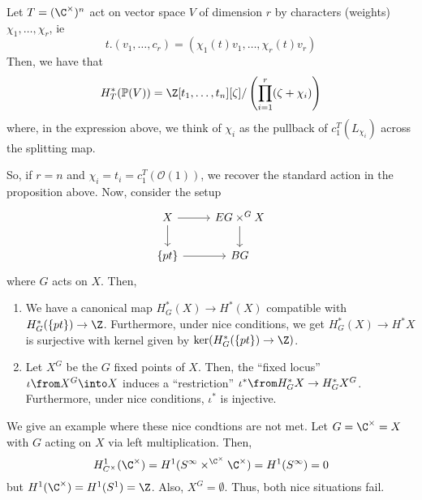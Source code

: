 \documentclass[11pt,leqno,oneside]{amsbook}
\renewcommand{\P}{\mathbb{P}}
\numberwithin{thm}{section}
\renewcommand{\O}{\mathcal{O}}
\begin{document}
\begin{thm}[A Generalization]
  Let \(T = (\C^\times)^n\) act on vector space \(V\) of dimension
  \(r\) by characters (weights) \(\chi_1, \ldots, \chi_r\), ie \[
    t.(v_1, \ldots, c_r) = (\chi_1(t)v_1, \ldots, \chi_r(t)v_r)
  \]
  Then, we have that \[
    H^*_T(\P(V)) = \Z[t_1, \ldots, t_n][\zeta]/\left( \prod_{i=1}^r (\zeta+\chi_i) \right)
  \]
  where, in the expression above, we think of \(\chi_i\) as the
  pullback of \(c_1^T(L_{\chi_i})\) across the splitting map. 
\end{thm}
So, if \(r=n\) and \(\chi_i = t_i = c_1^T(\O(1))\), we recover the
standard action in the proposition above. Now, consider the setup \[
  \begin{tikzcd}
    X \ar[d] \ar[r] & EG \times^G X \ar[d]\\
    \{pt\} \ar[r] & BG
  \end{tikzcd}
\]
where \(G\) acts on \(X\). Then,
\begin{enumerate}
\item We have a canonical map \(H^*_G(X) \to H^*(X)\) compatible with
  \(H^*_G(\{pt\}) \to \Z\). Furthermore, under nice conditions, we get
  \(H^*_G(X) \to H^*X\) is surjective with kernel given by
  \(\ker(H^*_G(\{pt\}) \to \Z)\).
\item Let \(X^G\) be the \(G\) fixed points of \(X\). Then, the
  ``fixed locus'' \(\iota \from X^G \into X\) induces a
  ``restriction'' \(\iota^* \from H_G^* X \to H_G^*
  X^G\). Furthermore, under nice conditions, \(\iota^*\) is
  injective. 
\end{enumerate}
\begin{example}
  We give an example where these nice condtions are not met. Let \(G =
  \C^\times = X\) with \(G\) acting on \(X\) via left
  multiplication. Then, \[
    H^1_{C^\times}(\C^\times) = H^1(S^\infty \times^{\C^\times}
    \C^\times) = H^1(S^\infty) = 0
  \]
  but \(H^1(\C^\times) = H^1(S^1) = \Z\). Also, \(X^G =
  \emptyset\). Thus, both nice situations fail. 
\end{example}
\end{document}
